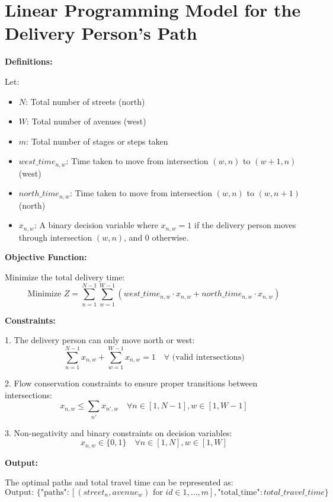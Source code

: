 \documentclass{article}
\begin{document}
\section*{Linear Programming Model for the Delivery Person's Path}

\textbf{Definitions:}

Let:
\begin{itemize}
    \item $N$: Total number of streets (north)
    \item $W$: Total number of avenues (west)
    \item $m$: Total number of stages or steps taken
    \item $west\_time_{n,w}$: Time taken to move from intersection $(w,n)$ to $(w+1,n)$ (west)
    \item $north\_time_{n,w}$: Time taken to move from intersection $(w,n)$ to $(w,n+1)$ (north)
    \item $x_{n,w}$: A binary decision variable where $x_{n,w} = 1$ if the delivery person moves through intersection $(w,n)$, and $0$ otherwise.
\end{itemize}

\textbf{Objective Function:}

Minimize the total delivery time:
\[
\text{Minimize } Z = \sum_{n=1}^{N-1} \sum_{w=1}^{W-1} \left( west\_time_{n,w} \cdot x_{n,w} + north\_time_{n,w} \cdot x_{n,w} \right)
\]

\textbf{Constraints:}

1. The delivery person can only move north or west:
   \[
   \sum_{n=1}^{N-1} x_{n,w} + \sum_{w=1}^{W-1} x_{n,w} = 1 \quad \forall \text{ (valid intersections)}
   \]

2. Flow conservation constraints to ensure proper transitions between intersections:
   \[
   x_{n,w} \leq \sum_{n'} x_{n',w} \quad \forall n \in [1, N-1], w \in [1, W-1]
   \]

3. Non-negativity and binary constraints on decision variables:
   \[
   x_{n,w} \in \{0,1\} \quad \forall n \in [1, N], w \in [1, W]
   \]

\textbf{Output:}

The optimal paths and total travel time can be represented as:
\[
\text{Output: } \{ \text{"paths"}: [(street_{n}, avenue_{w}) \text{ for } id \in 1, \ldots, m], \text{"total\_time"}: total\_travel\_time \}
\]
\end{document}
